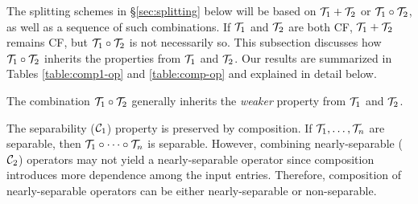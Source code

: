 The splitting schemes in \S\ref{sec:splitting} below will be based on ${\mathcal{T}}_1+{\mathcal{T}}_2$ or ${\mathcal{T}}_1\circ{\mathcal{T}}_2$, as well as a sequence of such combinations. If ${\mathcal{T}}_1$ and ${\mathcal{T}}_2$ are both CF, ${\mathcal{T}}_1+{\mathcal{T}}_2$ remains CF, but ${\mathcal{T}}_1\circ{\mathcal{T}}_2$ is not necessarily so. This subsection discusses how ${\mathcal{T}}_1\circ{\mathcal{T}}_2$ inherits the properties from ${\mathcal{T}}_1$ and ${\mathcal{T}}_2$. Our results are summarized in Tables \ref{table:comp1-op} and \ref{table:comp-op} and explained in detail below.

The combination ${\mathcal{T}}_1\circ {\mathcal{T}}_2$ generally inherits the \emph{weaker} property from ${\mathcal{T}}_1$ and ${\mathcal{T}}_2$. %

The separability (${\mathcal{C}}_1$) property  is  preserved by composition. If ${\mathcal{T}}_1,\ldots,{\mathcal{T}}_n$ are separable, then ${\mathcal{T}}_1\circ\cdots\circ {\mathcal{T}}_n$ is separable.  However, combining  nearly-separable (${\mathcal{C}}_2$) operators  may not yield a nearly-separable operator since composition introduces more dependence among the input entries. Therefore, composition of nearly-separable operators can be either nearly-separable or non-separable.

